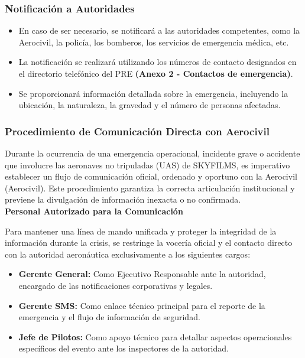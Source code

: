 \subsubsection{Notificación a Autoridades}
\begin{itemize}
    \item En caso de ser necesario, se notificará a las autoridades competentes, como la Aerocivil, la policía, los bomberos, los servicios de emergencia médica, etc.
    
    \item La notificación se realizará utilizando los números de contacto designados en el directorio telefónico del PRE \textbf{(Anexo 2 - Contactos de emergencia)}.
    \item Se proporcionará información detallada sobre la emergencia, incluyendo la ubicación, la naturaleza, la gravedad y el número de personas afectadas.
\end{itemize}

\subsubsection{Procedimiento de Comunicación Directa con Aerocivil}

Durante la ocurrencia de una emergencia operacional, incidente grave o accidente que involucre las aeronaves no tripuladas (UAS) de SKYFILMS, es imperativo establecer un flujo de comunicación oficial, ordenado y oportuno con la Aerocivil (Aerocivil). Este procedimiento garantiza la correcta articulación institucional y previene la divulgación de información inexacta o no confirmada.\\

\textbf{Personal Autorizado para la Comunicación}

Para mantener una línea de mando unificada y proteger la integridad de la información durante la crisis, se restringe la vocería oficial y el contacto directo con la autoridad aeronáutica exclusivamente a los siguientes cargos:

\begin{itemize}
    \item \textbf{Gerente General:} Como Ejecutivo Responsable ante la autoridad, encargado de las notificaciones corporativas y legales.

    \item \textbf{Gerente SMS:} Como enlace técnico principal para el reporte de la emergencia y el flujo de información de seguridad.

    \item \textbf{Jefe de Pilotos:} Como apoyo técnico para detallar aspectos operacionales específicos del evento ante los inspectores de la autoridad.
\end{itemize}


